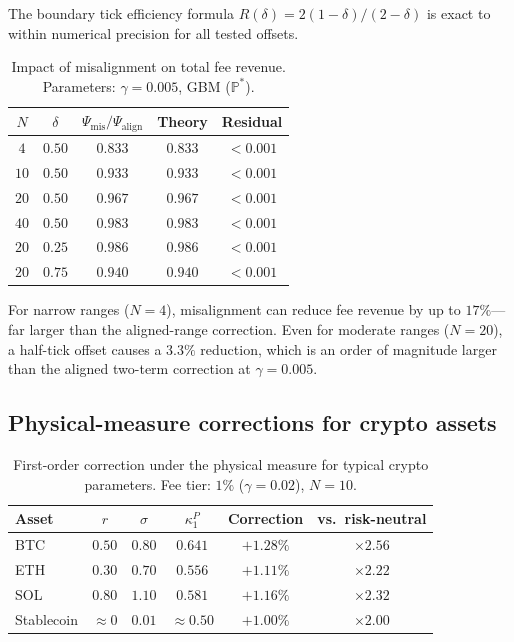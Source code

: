 \documentclass[11pt]{article}
\theoremstyle{definition}
\theoremstyle{remark}
\newcommand{\PP}{\mathbb{P}}
\begin{document}
The boundary tick efficiency formula $R(\delta) = 2(1-\delta)/(2-\delta)$
is exact to within numerical precision for all tested offsets.

\begin{table}[h]
\centering
\caption{Impact of misalignment on total fee revenue. Parameters:
$\gamma = 0.005$, GBM ($\PP^*$).}
\label{tab:misalignment_impact}
\begin{tabular}{ccccc}
\toprule
$N$ & $\delta$ & $\Psi_{\mathrm{mis}}/\Psi_{\mathrm{align}}$
& Theory & Residual \\
\midrule
$4$ & $0.50$ & $0.833$ & $0.833$ & $< 0.001$ \\
$10$ & $0.50$ & $0.933$ & $0.933$ & $< 0.001$ \\
$20$ & $0.50$ & $0.967$ & $0.967$ & $< 0.001$ \\
$40$ & $0.50$ & $0.983$ & $0.983$ & $< 0.001$ \\
$20$ & $0.25$ & $0.986$ & $0.986$ & $< 0.001$ \\
$20$ & $0.75$ & $0.940$ & $0.940$ & $< 0.001$ \\
\bottomrule
\end{tabular}
\end{table}

For narrow ranges ($N = 4$), misalignment can reduce fee revenue by
up to $17\%$---far larger than the aligned-range correction. Even for
moderate ranges ($N = 20$), a half-tick offset causes a $3.3\%$
reduction, which is an order of magnitude larger than the aligned
two-term correction at $\gamma = 0.005$.

\subsection{Physical-measure corrections for crypto assets}

\begin{table}[h]
\centering
\caption{First-order correction under the physical measure for
typical crypto parameters. Fee tier: $1\%$ ($\gamma = 0.02$),
$N = 10$.}
\label{tab:crypto}
\begin{tabular}{lccccc}
\toprule
Asset & $r$ & $\sigma$ & $\kappa_1^P$ & Correction
& vs.\ risk-neutral \\
\midrule
BTC & $0.50$ & $0.80$ & $0.641$ & $+1.28\%$
& $\times 2.56$ \\
ETH & $0.30$ & $0.70$ & $0.556$ & $+1.11\%$
& $\times 2.22$ \\
SOL & $0.80$ & $1.10$ & $0.581$ & $+1.16\%$
& $\times 2.32$ \\
Stablecoin & $\approx 0$ & $0.01$ & $\approx 0.50$
& $+1.00\%$ & $\times 2.00$ \\
\bottomrule
\end{tabular}
\end{table}
\end{document}
